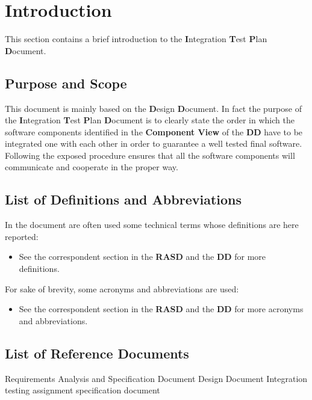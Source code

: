 \section{Introduction}
This section contains a brief introduction to the \textbf{I}ntegration \textbf{T}est \textbf{P}lan \textbf{D}ocument.
%
\subsection{Purpose and Scope}
This document is mainly based on the \textbf{D}esign \textbf{D}ocument. In fact the purpose of the \textbf{I}ntegration \textbf{T}est \textbf{P}lan \textbf{D}ocument is to clearly state the order in which the software components identified in the \textbf{Component View} of the \textbf{DD} have to be integrated one with each other in order to guarantee a well tested final software. Following the exposed procedure ensures that all the software components will communicate and cooperate in the proper way.
%
\subsection{List of Definitions and Abbreviations}
In the document are often used some technical terms whose definitions are here reported:
\begin{itemize}
	 An atomic procedure done to test the integration of a component on the top of another one.
	 A collection of \textbf{Integration Test Cases}.
	\item See the correspondent section in the \textbf{RASD} and the \textbf{DD} for more definitions.
\end{itemize}
For sake of brevity, some acronyms and abbreviations are used:
\begin{itemize}
	 Integration Test Plan Document.
	 Integration Test Suite number n.
	 Integration Test Case number m of the Integration Test Suite number n.
	 JavaScript.
	 User Interface.
	\item See the correspondent section in the \textbf{RASD} and the \textbf{DD} for more acronyms and abbreviations.
\end{itemize}
%
\subsection{List of Reference Documents}
\begin{itemize}
	 Requirements Analysis and Specification Document
	 Design Document
	 Integration testing assignment specification document
\end{itemize}